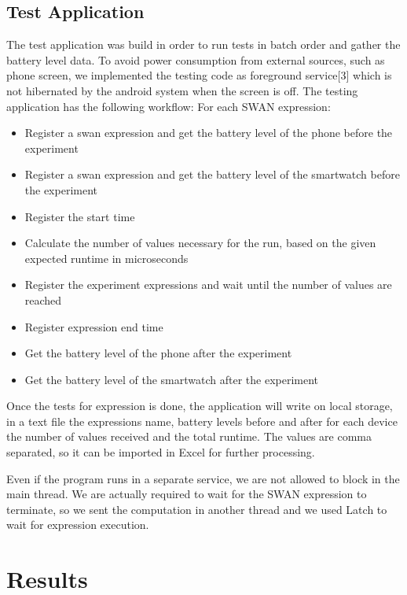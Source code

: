 \subsection{Test Application}
The test application was build in order to run tests in batch order and gather the battery level data. To avoid power consumption from external sources, such as phone screen, we implemented the testing code as foreground service[3] which is not hibernated by the android system when the screen is off. 
The testing application has the following workflow:
For each SWAN expression:
\begin{itemize}
 \item Register a swan expression and get the battery level of the phone before the experiment
 \item Register a swan expression and get the battery level of the smartwatch before the experiment
 \item Register the start time
 \item Calculate the number of values necessary for the run, based on the given expected runtime in microseconds
 \item Register the experiment expressions and wait until the number of values are reached
 \item Register expression end time
 \item Get the battery level of the phone after the experiment
 \item Get the battery level of the smartwatch after the experiment
\end{itemize}


Once the tests for expression is done, the application will write on local storage, in a text file the expressions name,
battery levels before and after for each device the number of values received and the total runtime.
 The values are comma separated, so it can be imported in Excel for further processing.

Even if the program runs in a separate service, we are not allowed to block in the main thread. 
We are actually required to wait for the SWAN expression to terminate, so we sent the computation in another thread and we used Latch to wait for expression execution.

 \section{Results}
